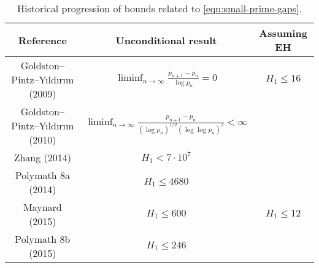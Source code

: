 \begin{table}[ht]
    \caption{Historical progression of bounds related to \eqref{eqn:small-prime-gaps}.}
    \centering
    \renewcommand{\arraystretch}{2.2}
    \begin{tabular}{|c|c|c|}
    \hline
    Reference & Unconditional result & Assuming EH \\
    \hline
    Goldston--Pintz--Yıldırım (2009) \cite{goldston_primes_2009} & $\displaystyle\liminf_{n\to\infty}\frac{p_{n + 1} - p_n}{\log p_n} = 0$ & $H_1 \le 16$ \\
    \hline
    Goldston--Pintz--Yıldırım (2010) \cite{goldston_primes_2010} & $\displaystyle\liminf_{n\to\infty}\frac{p_{n + 1} - p_n}{(\log p_n)^{1/2}(\log\log p_n)^2} < \infty$ & \\
    \hline
    Zhang (2014) \cite{zhang_bounded_2014} & $H_1 < 7\cdot 10^7$ & \\
    \hline
    Polymath 8a (2014) \cite{castryck_new_2014} & $H_1 \le 4680$ & \\
    \hline
    Maynard (2015) \cite{maynard_small_2015} & $H_1 \le 600$ & $H_1 \le 12$ \\
    \hline
    Polymath 8b (2015) \cite{polymath_variants_2014} & $H_1 \le 246$ & \\
    \hline
    \end{tabular}
\end{table}\label{small-primegap-table}

